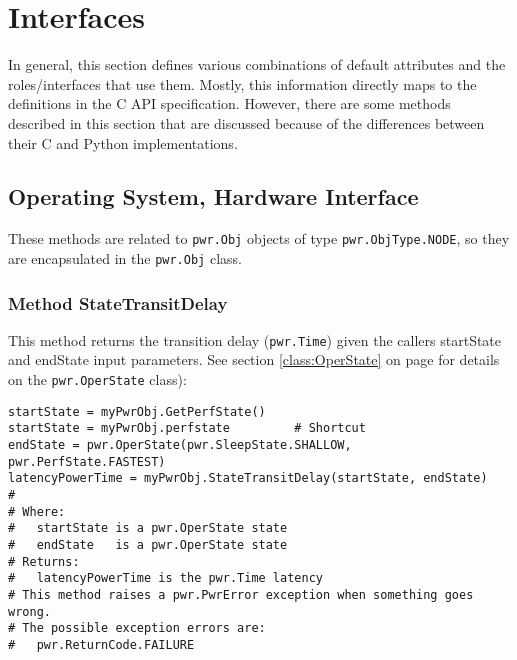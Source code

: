 \section{Interfaces}\label{sec:PythonInterfaces}
In general, this section defines various combinations of default attributes and
the roles/interfaces that use them. Mostly, this information directly
maps to the definitions in the C API specification. However, there are some
methods described in this section that are discussed because of the
differences between their C and Python implementations.

\subsection{Operating System, Hardware Interface}
\label{sec:PythonOperatingSystemInterface}

These methods are related to \texttt{pwr.Obj} objects of type
\texttt{pwr.ObjType.NODE}, so they are encapsulated in the \texttt{pwr.Obj}
class.

\subsubsection{Method StateTransitDelay} \label{meth:StateTransitDelay}

This method returns the transition delay (\texttt{pwr.Time}) given the callers startState
and endState input parameters. See section \ref{class:OperState} on page
\pageref{class:OperState} for details on the \texttt{pwr.OperState} class): 

\begin{center}\begin{minipage}{.95\linewidth}\begin{lstlisting}
startState = myPwrObj.GetPerfState()
startState = myPwrObj.perfstate         # Shortcut
endState = pwr.OperState(pwr.SleepState.SHALLOW, pwr.PerfState.FASTEST)
latencyPowerTime = myPwrObj.StateTransitDelay(startState, endState)
#
# Where:
#   startState is a pwr.OperState state 
#   endState   is a pwr.OperState state
# Returns:
#   latencyPowerTime is the pwr.Time latency
# This method raises a pwr.PwrError exception when something goes wrong.
# The possible exception errors are: 
#   pwr.ReturnCode.FAILURE
\end{lstlisting}\end{minipage}\end{center}

